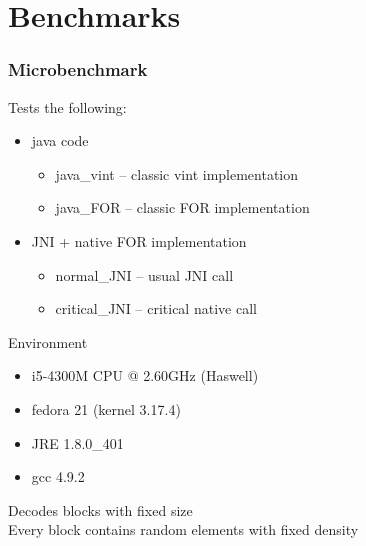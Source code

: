 \documentclass{beamer}
\begin{document}
	\section{Benchmarks}
	\begin{frame}
		\frametitle{Microbenchmark}
		Tests the following:
		\begin{itemize}
		\item java code
		\begin{itemize}
		\item java\_vint -- classic vint implementation
		\item java\_FOR -- classic FOR implementation
		\end{itemize}
		\item JNI + native FOR implementation
		\begin{itemize}
		\item normal\_JNI -- usual JNI call
		\item critical\_JNI -- critical native call
		\end{itemize}
		\end{itemize}
		Environment
			\begin{itemize}
				\item i5-4300M CPU @ 2.60GHz (Haswell)
				\item fedora 21 (kernel 3.17.4)
				\item JRE 1.8.0\_401
				\item gcc 4.9.2 
			\end{itemize}
		\vskip15pt
		Decodes blocks with fixed size\\
		Every block contains random elements with fixed density
	\end{frame}
\end{document}
